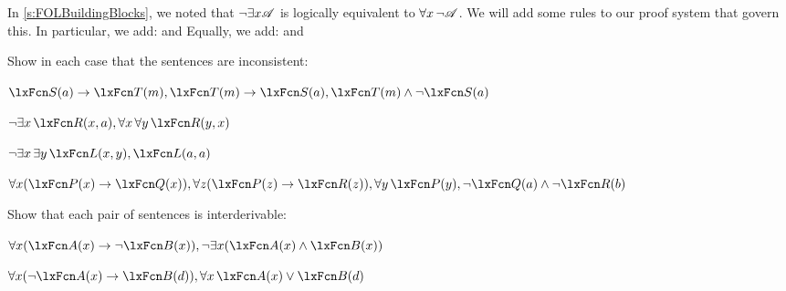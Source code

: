 In \cref{s:FOLBuildingBlocks}, we noted that $\neg\exists x\mathscr{A}$ is logically equivalent to $\forall x\, \neg\mathscr{A}$. We will add some rules to our proof system that govern this. In particular, we add:
and
Equally, we add:
and

\practiceproblems
\problempart
Show in each case that the sentences are inconsistent:
\begin{compactlist}
\item $\atom{S}{a}\eif \atom{T}{m}, \atom{T}{m} \eif \atom{S}{a}, \atom{T}{m} \eand \enot \atom{S}{a}$
\item $\enot\exists x\,\atom{R}{x,a}, \forall x\, \forall y\,\atom{R}{y,x}$
\item $\enot\exists x\, \exists y\,\atom{L}{x,y}, \atom{L}{a,a}$
\item $\forall x(\atom{P}{x} \eif \atom{Q}{x}), \forall z(\atom{P}{z} \eif \atom{R}{z}), \forall y\,\atom{P}{y}, \enot \atom{Q}{a} \eand \enot \atom{R}{b}$
\end{compactlist}

\problempart
Show that each pair of sentences is interderivable:
\begin{compactlist}
\item $\forall x (\atom{A}{x}\eif \enot \atom{B}{x}), \enot\exists x(\atom{A}{x} \eand \atom{B}{x})$
\item $\forall x (\enot\atom{A}{x}\eif \atom{B}{d}), \forall x\,\atom{A}{x} \eor \atom{B}{d}$
\end{compactlist}

